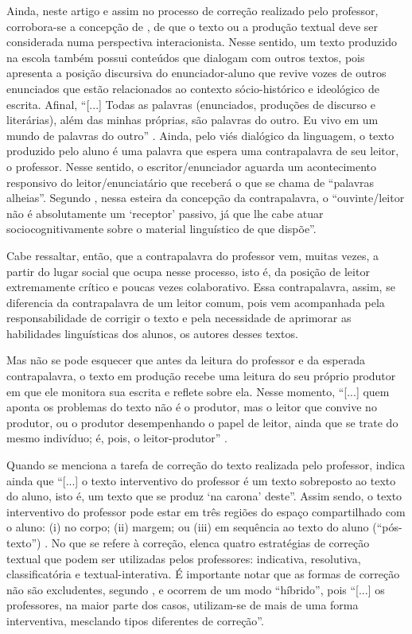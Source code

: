 \documentclass[portuguese]{textolivre}
\begin{document}
Ainda, neste artigo e assim no processo de correção realizado pelo professor, corrobora-se a concepção de \textcite[p. 96]{goncalves2023}, de que o texto ou a produção textual deve ser considerada numa perspectiva interacionista. Nesse sentido, um texto produzido na escola também possui conteúdos que dialogam com outros textos, pois apresenta a posição discursiva do enunciador-aluno que revive vozes de outros enunciados que estão relacionados ao contexto sócio-histórico e ideológico de escrita. Afinal, ``[...] Todas as palavras (enunciados, produções de discurso e literárias), além das minhas próprias, são palavras do outro. Eu vivo em um mundo de palavras do outro'' \cite[p. 379]{bakhtin2011}. Ainda, pelo viés dialógico da linguagem, o texto produzido pelo aluno é uma palavra que espera uma contrapalavra \cite{bakhtin2002, bakhtin2010, bakhtin2011} de seu leitor, o professor. Nesse sentido, o escritor/enunciador aguarda um acontecimento responsivo do leitor/enunciatário que receberá o que se chama de ``palavras alheias''. Segundo \textcite[p. 23]{ruiz2015}, nessa esteira da concepção da contrapalavra, o ``ouvinte/leitor não é absolutamente um `receptor' passivo, já que lhe cabe atuar sociocognitivamente sobre o material linguístico de que dispõe''.

Cabe ressaltar, então, que a contrapalavra do professor vem, muitas vezes, a partir do lugar social que ocupa nesse processo, isto é, da posição de leitor extremamente crítico e poucas vezes colaborativo. Essa contrapalavra, assim, se diferencia da contrapalavra de um leitor comum, pois vem acompanhada pela responsabilidade de corrigir o texto e pela necessidade de aprimorar as habilidades linguísticas dos alunos, os autores desses textos.

Mas não se pode esquecer que antes da leitura do professor e da esperada contrapalavra, o texto em produção recebe uma leitura do seu próprio produtor em que ele monitora sua escrita e reflete sobre ela. Nesse momento, ``[...] quem aponta os problemas do texto não é o produtor, mas o leitor que convive no produtor, ou o produtor desempenhando o papel de leitor, ainda que se trate do mesmo indivíduo; é, pois, o leitor-produtor'' \cite[p. 20]{ruiz2015}.

Quando se menciona a tarefa de correção do texto realizada pelo professor, \textcite[p. 34]{ruiz2015} indica ainda que ``[...] o texto interventivo do professor é um texto sobreposto ao texto do aluno, isto é, um texto que se produz `na carona' deste''. Assim sendo, o texto interventivo do professor pode estar em três regiões do espaço compartilhado com o aluno: (i) no corpo; (ii) margem; ou (iii) em sequência ao texto do aluno (``pós-texto'') \cite[p. 35]{ruiz2015}. No que se refere à correção, \textcite{ruiz2015} elenca quatro estratégias de correção textual que podem ser utilizadas pelos professores: indicativa, resolutiva, classificatória e textual-interativa. É importante notar que as formas de correção não são excludentes, segundo \textcite[p. 35]{ruiz2015}, e ocorrem de um modo ``híbrido'', pois ``[...] os professores, na maior parte dos casos, utilizam-se de mais de uma forma interventiva, mesclando tipos diferentes de correção''.
\end{document}
